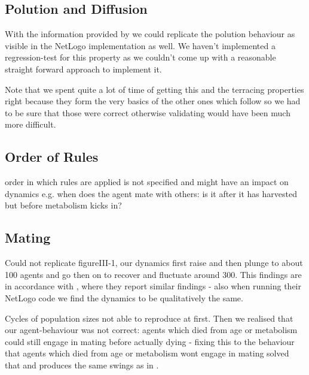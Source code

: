 \subsection{Polution and Diffusion}
With the information provided by \cite{weaver_replicating_nodate} we could replicate the polution behaviour as visible in the NetLogo implementation as well. We haven't implemented a regression-test for this property as we couldn't come up with a reasonable straight forward approach to implement it.

Note that we spent quite a lot of time of getting this and the terracing properties right because they form the very basics of the other ones which follow so we had to be sure that those were correct otherwise validating would have been much more difficult.

\subsection{Order of Rules}
order in which rules are applied is not specified and might have an impact on dynamics e.g. when does the agent mate with others: is it after it has harvested but before metabolism kicks in?

\subsection{Mating}
Could not replicate figureIII-1, our dynamics first raise and then plunge to about 100 agents and go then on to recover and fluctuate around 300. This findings are in accordance with \cite{weaver_replicating_nodate}, where they report similar findings - also when running their NetLogo code we find the dynamics to be qualitatively the same.

Cycles of population sizes not able to reproduce at first. Then we realised that our agent-behaviour was not correct: agents which died from age or metabolism could still engage in mating before actually dying - fixing this to the behaviour that agents which died from age or metabolism wont engage in mating solved that and produces the same swings as in \cite{weaver_replicating_nodate}.